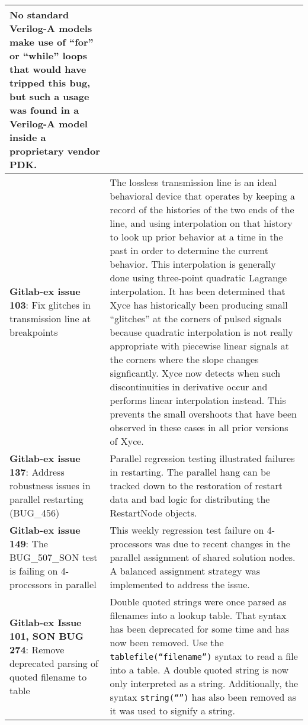 {\begin{longtable}[h] {>{\raggedright\small}m{2in}|>{\raggedright\let\\\tabularnewline\small}m{3.5in}}
No standard Verilog-A models make use of ``for'' or ``while'' loops
that would have tripped this bug, but such a usage was found in a
Verilog-A model inside a proprietary vendor PDK. \\ \hline

\textbf{Gitlab-ex issue 103}: Fix glitches in transmission line at breakpoints &
The lossless transmission line is an ideal behavioral device that
operates by keeping a record of the histories of the two ends of the
line, and using interpolation on that history to look up prior
behavior at a time in the past in order to determine the current
behavior.  This interpolation is generally done using three-point
quadratic Lagrange interpolation.  It has been determined that Xyce
has historically been producing small ``glitches'' at the corners of
pulsed signals because quadratic interpolation is not really
appropriate with piecewise linear signals at the corners where the
slope changes signficantly.  Xyce now detects when such
discontinuities in derivative occur and performs linear interpolation
instead.  This prevents the small overshoots that have been observed
in these cases in all prior versions of Xyce. \\ \hline

\textbf{Gitlab-ex issue 137}: Address robustness issues in parallel restarting (BUG\_456) &
Parallel regression testing illustrated failures in restarting.  The parallel hang 
can be tracked down to the restoration of restart data and bad logic for
distributing the RestartNode objects. \\ \hline

\textbf{Gitlab-ex issue 149}: The BUG\_507\_SON test is failing on 4-processors in parallel &
This weekly regression test failure on 4-processors was due to recent changes in the 
parallel assignment of shared solution nodes.  A balanced assignment strategy was 
implemented to address the issue. \\ \hline

\textbf{Gitlab-ex Issue 101, SON BUG 274}:  Remove deprecated parsing of quoted filename to table &
Double quoted strings were once parsed as filenames into a lookup table.  That syntax 
has been deprecated for some time and has now been removed. Use the \texttt{tablefile(``filename'')}
syntax to read a file into a table.  A double quoted string is 
now only interpreted as a string.  Additionally, the syntax \texttt{string(``'')} 
has also been removed as it was used to signify a string.
\\ \hline


\end{longtable}}
